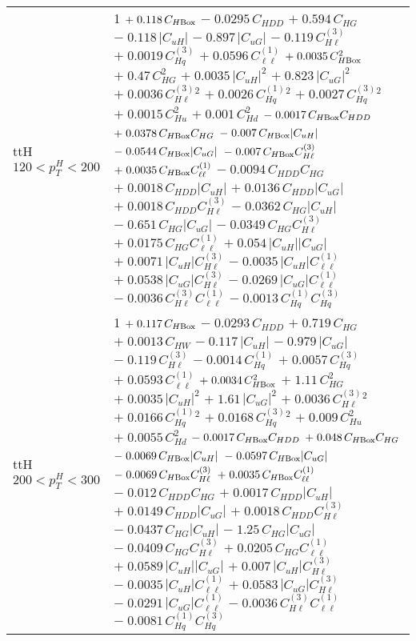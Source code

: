 \begin{tabular}{l|p{}}
    ttH $120 < p_{T}^{H} < 200$ & 1 $+\;0.118\,C_{H\rm{Box}}$ $-\;0.0295\,C_{HDD}$ $+\;0.594\,C_{HG}$ $-\;0.118\,|C_{uH}|$ $-\;0.897\,|C_{uG}|$ $-\;0.119\,C^{(3)}_{H\ell}$ $+\;0.0019\,C^{(3)}_{Hq}$ $+\;0.0596\,C^{(1)}_{\ell\ell}$ $+\;0.0035\,C_{H\rm{Box}}^{2}$ $+\;0.47\,C_{HG}^{2}$ $+\;0.0035\,|C_{uH}|^{2}$ $+\;0.823\,|C_{uG}|^{2}$ $+\;0.0036\,C^{(3)}_{H\ell}^{2}$ $+\;0.0026\,C^{(1)}_{Hq}^{2}$ $+\;0.0027\,C^{(3)}_{Hq}^{2}$ $+\;0.0015\,C_{Hu}^{2}$ $+\;0.001\,C_{Hd}^{2}$ $-\;0.0017\,C_{H\rm{Box}}C_{HDD}$ $+\;0.0378\,C_{H\rm{Box}}C_{HG}$ $-\;0.007\,C_{H\rm{Box}}|C_{uH}|$ $-\;0.0544\,C_{H\rm{Box}}|C_{uG}|$ $-\;0.007\,C_{H\rm{Box}}C^{(3)}_{H\ell}$ $+\;0.0035\,C_{H\rm{Box}}C^{(1)}_{\ell\ell}$ $-\;0.0094\,C_{HDD}C_{HG}$ $+\;0.0018\,C_{HDD}|C_{uH}|$ $+\;0.0136\,C_{HDD}|C_{uG}|$ $+\;0.0018\,C_{HDD}C^{(3)}_{H\ell}$ $-\;0.0362\,C_{HG}|C_{uH}|$ $-\;0.651\,C_{HG}|C_{uG}|$ $-\;0.0349\,C_{HG}C^{(3)}_{H\ell}$ $+\;0.0175\,C_{HG}C^{(1)}_{\ell\ell}$ $+\;0.054\,|C_{uH}||C_{uG}|$ $+\;0.0071\,|C_{uH}|C^{(3)}_{H\ell}$ $-\;0.0035\,|C_{uH}|C^{(1)}_{\ell\ell}$ $+\;0.0538\,|C_{uG}|C^{(3)}_{H\ell}$ $-\;0.0269\,|C_{uG}|C^{(1)}_{\ell\ell}$ $-\;0.0036\,C^{(3)}_{H\ell}C^{(1)}_{\ell\ell}$ $-\;0.0013\,C^{(1)}_{Hq}C^{(3)}_{Hq}$ \\
    ttH $200 < p_{T}^{H} < 300$ & 1 $+\;0.117\,C_{H\rm{Box}}$ $-\;0.0293\,C_{HDD}$ $+\;0.719\,C_{HG}$ $+\;0.0013\,C_{HW}$ $-\;0.117\,|C_{uH}|$ $-\;0.979\,|C_{uG}|$ $-\;0.119\,C^{(3)}_{H\ell}$ $-\;0.0014\,C^{(1)}_{Hq}$ $+\;0.0057\,C^{(3)}_{Hq}$ $+\;0.0593\,C^{(1)}_{\ell\ell}$ $+\;0.0034\,C_{H\rm{Box}}^{2}$ $+\;1.11\,C_{HG}^{2}$ $+\;0.0035\,|C_{uH}|^{2}$ $+\;1.61\,|C_{uG}|^{2}$ $+\;0.0036\,C^{(3)}_{H\ell}^{2}$ $+\;0.0166\,C^{(1)}_{Hq}^{2}$ $+\;0.0168\,C^{(3)}_{Hq}^{2}$ $+\;0.009\,C_{Hu}^{2}$ $+\;0.0055\,C_{Hd}^{2}$ $-\;0.0017\,C_{H\rm{Box}}C_{HDD}$ $+\;0.048\,C_{H\rm{Box}}C_{HG}$ $-\;0.0069\,C_{H\rm{Box}}|C_{uH}|$ $-\;0.0597\,C_{H\rm{Box}}|C_{uG}|$ $-\;0.0069\,C_{H\rm{Box}}C^{(3)}_{H\ell}$ $+\;0.0035\,C_{H\rm{Box}}C^{(1)}_{\ell\ell}$ $-\;0.012\,C_{HDD}C_{HG}$ $+\;0.0017\,C_{HDD}|C_{uH}|$ $+\;0.0149\,C_{HDD}|C_{uG}|$ $+\;0.0018\,C_{HDD}C^{(3)}_{H\ell}$ $-\;0.0437\,C_{HG}|C_{uH}|$ $-\;1.25\,C_{HG}|C_{uG}|$ $-\;0.0409\,C_{HG}C^{(3)}_{H\ell}$ $+\;0.0205\,C_{HG}C^{(1)}_{\ell\ell}$ $+\;0.0589\,|C_{uH}||C_{uG}|$ $+\;0.007\,|C_{uH}|C^{(3)}_{H\ell}$ $-\;0.0035\,|C_{uH}|C^{(1)}_{\ell\ell}$ $+\;0.0583\,|C_{uG}|C^{(3)}_{H\ell}$ $-\;0.0291\,|C_{uG}|C^{(1)}_{\ell\ell}$ $-\;0.0036\,C^{(3)}_{H\ell}C^{(1)}_{\ell\ell}$ $-\;0.0081\,C^{(1)}_{Hq}C^{(3)}_{Hq}$ \\

\end{tabular}
